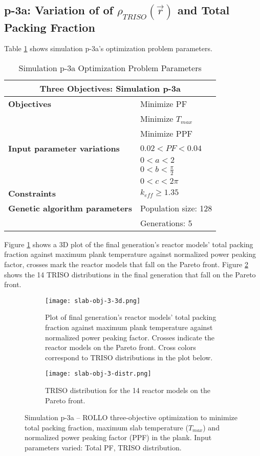 \subsection{p-3a: Variation of of $\rho_{TRISO}(\vec{r})$ and Total Packing Fraction}
Table \ref{tab:simulationp3a} shows simulation p-3a's optimization problem parameters. 
\begin{table}[htbp!]
    \centering
    \onehalfspacing
    \caption{Simulation p-3a Optimization Problem Parameters}
	\label{tab:simulationp3a}
    \footnotesize
    \begin{tabular}{l|p{4cm}}
    \hline 
    \multicolumn{2}{c}{\textbf{Three Objectives: Simulation p-3a}} \\
    \hline 
    \textbf{Objectives} & Minimize PF \\
    & Minimize $T_{max}$ \\
    & Minimize PPF \\
    \hline 
    \textbf{Input parameter variations} & $0.02<PF<0.04$ \\
    & $0<a<2$ \\
    & $0<b<\frac{\pi}{2}$ \\
    & $0<c<2\pi$ \\
    \hline
    \textbf{Constraints} & $k_{eff} \geq 1.35$\\ 
    \hline 
    \textbf{Genetic algorithm parameters} & Population size: 128 \\
    & Generations: 5 \\
    \hline
    \end{tabular}
\end{table}

Figure \ref{fig:slab-obj-3-3d} shows a 3D plot of the final generation's reactor models' 
total packing fraction against maximum plank temperature against normalized power 
peaking factor, crosses mark the reactor models that fall on the Pareto front.
Figure \ref{fig:slab-obj-3-distr} shows the 14 TRISO distributions in 
the final generation that fall on the Pareto front. 
\begin{figure}[htbp!]
    \begin{subfigure}{\textwidth}
        \centering
        \texttt{[image: slab-obj-3-3d.png]}
        \caption{Plot of final generation's reactor models' total packing fraction against maximum plank 
        temperature against normalized power peaking factor. Crosses indicate the reactor models on the 
        Pareto front. Cross colors correspond to TRISO distributions in the plot below.}
        \label{fig:slab-obj-3-3d} 
    \end{subfigure}
    \begin{subfigure}{\textwidth}
        \texttt{[image: slab-obj-3-distr.png]}
        \caption{TRISO distribution for the 14 reactor models on the Pareto front.}
        \label{fig:slab-obj-3-distr} 
    \end{subfigure}
    \caption{Simulation p-3a -- ROLLO three-objective optimization to minimize total packing fraction, 
    maximum slab temperature ($T_{max}$) and normalized power peaking factor (PPF) in the plank. 
    Input parameters varied: Total PF, TRISO distribution.}
    \label{fig:slab-obj-3}
\end{figure}


